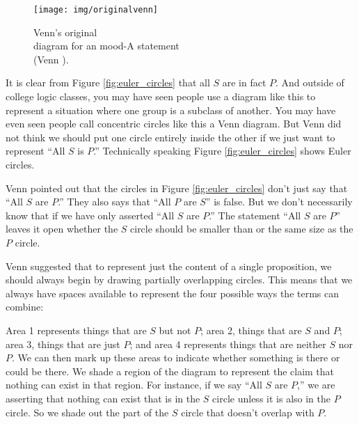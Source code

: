 \begin{figure}
\begin{mdframed}[style=mytableclearbox, userdefinedwidth=.3\textwidth]
\begin{center}
\texttt{[image: img/originalvenn]}
\end{center}
\end{mdframed}
\caption{Venn's original \\ diagram for an mood-A statement \\(Venn \citeyear{Venn1880a}).}
\end{figure}


It is clear from Figure \ref{fig:euler_circles} that all $S$ are in fact $P$. And outside of college logic classes, you may have seen people use a diagram like this to represent a situation where one group is a subclass of another. You may have even seen people call concentric circles like this a Venn diagram. But Venn did not think we should put one circle entirely inside the other if we just want to represent ``All $S$ is $P$.'' Technically speaking Figure \ref{fig:euler_circles} shows Euler circles.

Venn pointed out that the circles in Figure \ref{fig:euler_circles} don't just say that ``All $S$ are $P$.'' They also says that ``All $P$ are $S$'' is false. But we don't necessarily know that if we have only asserted ``All $S$ are $P$.'' The statement ``All $S$ are $P$'' leaves it open whether the $S$ circle should be smaller than or the same size as the $P$ circle.

Venn suggested that to represent just the content of a single proposition, we should always begin by drawing partially overlapping circles. This means that we always have spaces available to represent the four possible ways the terms can combine: 

\begin{center}
\label{fig:two_circle_venn}
\end{center}

Area 1 represents things that are $S$ but not $P$; area 2, things that are $S$ and $P$; area 3, things that are just $P$; and area 4 represents things that are neither $S$ nor $P$. We can then mark up these areas to indicate whether something is there or could be there. We shade a region of the diagram to represent the claim that nothing can exist in that region. For instance, if we say ``All $S$ are $P$,'' we are asserting that nothing can exist that is in the $S$ circle unless it is also in the $P$ circle. So we shade out the part of the $S$ circle that doesn't overlap with $P$. 

